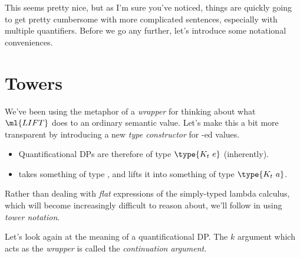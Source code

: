 \documentclass[nols,nofonts,nobib,nohyper]{tufte-book}
\begin{document}
           This seems pretty nice, but as I'm sure you've noticed, things are
           quickly going to get pretty cumbersome with more complicated
           sentences, especially with multiple quantifiers. Before we go any
           further, let's introduce some notational conveniences.

\section{Towers}

We've been using the metaphor of a \textit{wrapper} for thinking about what
$\ml{LIFT}$ does to an ordinary semantic value. Let's make this a bit more
transparent by introducing a new \textit{type constructor} for -ed
values.

\ex
{}
\xe


\begin{itemize}

\item Quantificational DPs are therefore of type $\type{{K}_{t} e}$ (inherently).

\item {} takes something of type , and lifts it into
    something of type $\type{K_{t} a}$.

\end{itemize}

Rather than dealing with \textit{flat} expressions of the simply-typed lambda
calculus, which will become increasingly difficult to reason about, we'll follow
\cite{barkerShan2015} in using \textit{tower notation}.

Let's look again at the meaning of a quantificational DP. The $k$ argument which
acts as the \textit{wrapper} is called the \textit{continuation argument}.
\end{document}
